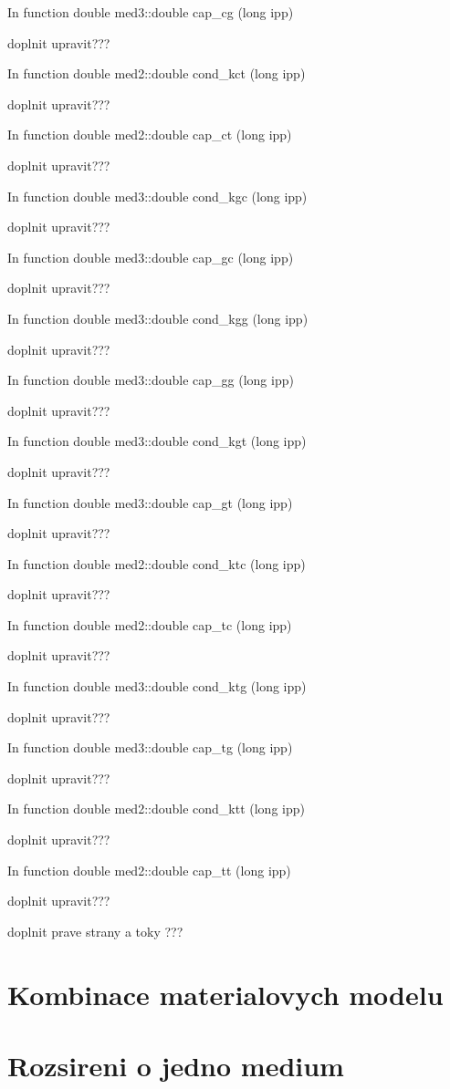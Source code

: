 In function {\sf double med3::double cap\_cg (long ipp)}


doplnit upravit???


In function {\sf double med2::double cond\_kct (long ipp)}

doplnit upravit???

In function {\sf double med2::double cap\_ct (long ipp)}

doplnit upravit???


In function {\sf double med3::double cond\_kgc (long ipp)}

doplnit upravit???

In function {\sf double med3::double cap\_gc (long ipp)}

doplnit upravit???

In function {\sf double med3::double cond\_kgg (long ipp)}

doplnit upravit???

In function {\sf double med3::double cap\_gg (long ipp)}

doplnit upravit???

In function {\sf double med3::double cond\_kgt (long ipp)}

doplnit upravit???

In function {\sf double med3::double cap\_gt (long ipp)}


doplnit upravit???



In function {\sf double med2::double cond\_ktc (long ipp)}

doplnit upravit???

In function {\sf double med2::double cap\_tc (long ipp)}

doplnit upravit???

In function {\sf double med3::double cond\_ktg (long ipp)}

doplnit upravit???

In function {\sf double med3::double cap\_tg (long ipp)}

doplnit upravit???



In function {\sf double med2::double cond\_ktt (long ipp)}

doplnit upravit???

In function {\sf double med2::double cap\_tt (long ipp)}

doplnit upravit???


doplnit prave strany a toky ???


\section{Kombinace materialovych modelu}


\section{Rozsireni o jedno medium}